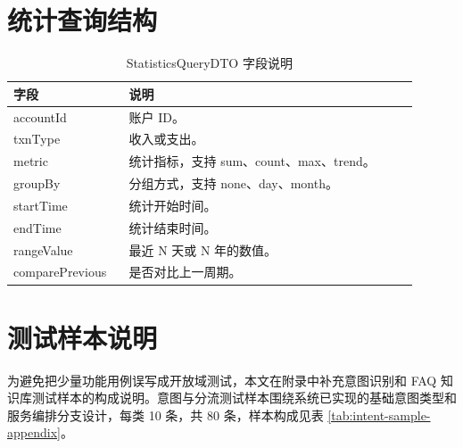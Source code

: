 \documentclass[bachelor, print]{xduthesis}
\begin{document}
\begin{appendix}
\section{统计查询结构}

\begin{table}[H]
    \centering
    \caption{StatisticsQueryDTO 字段说明}
    \label{tab:statistics-query}
    \begin{tabular}{|p{0.25\linewidth}|p{0.65\linewidth}|}
        \hline
        字段 & 说明 \\
        \hline
        accountId & 账户 ID。 \\
        \hline
        txnType & 收入或支出。 \\
        \hline
        metric & 统计指标，支持 sum、count、max、trend。 \\
        \hline
        groupBy & 分组方式，支持 none、day、month。 \\
        \hline
        startTime & 统计开始时间。 \\
        \hline
        endTime & 统计结束时间。 \\
        \hline
        rangeValue & 最近 N 天或 N 年的数值。 \\
        \hline
        comparePrevious & 是否对比上一周期。 \\
        \hline
    \end{tabular}
\end{table}


\section{测试样本说明}
\label{app:test-samples}

为避免把少量功能用例误写成开放域测试，本文在附录中补充意图识别和 FAQ 知识库测试样本的构成说明。意图与分流测试样本围绕系统已实现的基础意图类型和服务编排分支设计，每类 10 条，共 80 条，样本构成见表 \ref{tab:intent-sample-appendix}。


\end{appendix}
\end{document}
